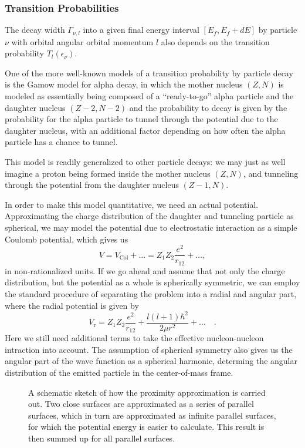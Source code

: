 \clearpage
\subsubsection{Transition Probabilities}
The decay width $\Gamma_{\nu,l}$ into a given final energy interval $[E_f,E_f+dE]$ by particle $\nu$ with orbital angular orbital momentum $l$ also depends on the transition probability $T_l(\epsilon_\nu)$.

One of the more well-known models of a transition probability by particle decay is the Gamow model for alpha decay, in which the mother nucleus $(Z,N)$ is modeled as essentially being composed of a ``ready-to-go'' alpha particle and the daughter nucleus $(Z-2,N-2)$ and the probability to decay is given by the probability for the alpha particle to tunnel through the potential due to the daughter nucleus, with an additional factor depending on how often the alpha particle has a chance to tunnel. 

This model is readily generalized to other particle decays: we may just as well imagine a proton being formed inside the mother nucleus $(Z,N)$, and tunneling through the potential from the daughter nucleus $(Z-1,N)$.

In order to make this model quantitative, we need an actual potential. Approximating the charge distribution of the daughter and tunneling particle as spherical, we may model the potential due to electrostatic interaction as a simple Coulomb potential, which gives us
\begin{equation}
V = V_\text{Col} + \dots =  Z_1 Z_2 \frac{e^2}{r_{12}} + \dots,
\end{equation}
in non-rationalized units.
If we go ahead and assume that not only the charge distribution, but the potential as a whole is spherically symmetric, we can employ the standard procedure of separating the problem into a radial and angular part, where the radial potential is given by
\begin{equation}
V_\text{r} = Z_1 Z_2 \frac{e^2}{r_{12}} + \frac{l(l+1)\hbar^2}{2\mu r^2} + \dots\quad .
\end{equation}
Here we still need additional terms to take the effective nucleon-nucleon intraction into account. The assumption of spherical symmetry also gives us the angular part of the wave function as a spherical harmonic,  determing the angular distribution of the emitted particle in the center-of-mass frame.

\begin{figure}
\begin{center}

\caption{\label{fig:prox} A schematic sketch of how the proximity approximation is carried out. Two close surfaces are approximated as a series of parallel surfaces, which in turn are approximated as infinite parallel surfaces, for which the potential energy is easier to calculate. This result is then summed up for all parallel surfaces.}
\end{center}
\end{figure}

